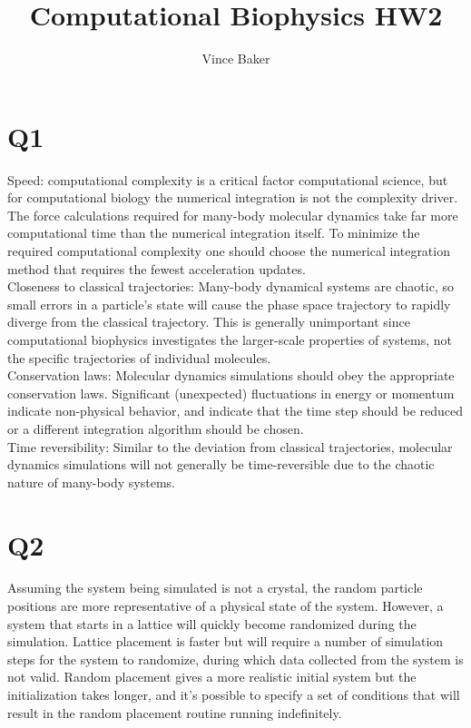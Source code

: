 \documentclass[a4paper,11pt]{article}
\title{Computational Biophysics HW2}
\author{Vince Baker}
\numberwithin{equation}{section}
\begin{document}
\maketitle

\section{Q1}
Speed: computational complexity is a critical factor computational science, but for computational biology the numerical integration is not the complexity driver.
The force calculations required for many-body molecular dynamics take far more computational time than the numerical integration itself. 
To minimize the required computational complexity one should choose the numerical integration method that requires the fewest acceleration updates.\\
Closeness to classical trajectories: Many-body dynamical systems are chaotic, so small errors in a particle's state will cause the phase space trajectory to rapidly diverge from the classical trajectory.
This is generally unimportant since computational biophysics investigates the larger-scale properties of systems, not the specific trajectories of individual molecules.\\
Conservation laws: Molecular dynamics simulations should obey the appropriate conservation laws. 
Significant (unexpected) fluctuations in energy or momentum indicate non-physical behavior, and indicate that the time step should be reduced or a different integration algorithm should be chosen.\\
Time reversibility: Similar to the deviation from classical trajectories, molecular dynamics simulations will not generally be time-reversible due to the chaotic nature of many-body systems.
\\
\section{Q2}
Assuming the system being simulated is not a crystal, the random particle positions are more representative of a physical state of the system.
However, a system that starts in a lattice will quickly become randomized during the simulation. 
Lattice placement is faster but will require a number of simulation steps for the system to randomize, during which data collected from the system is not valid.
Random placement gives a more realistic initial system but the initialization takes longer, and it's possible to specify a set of conditions that will result in the random placement routine running indefinitely.
\\
\end{document}
